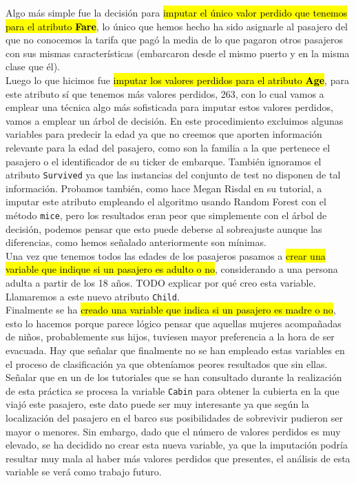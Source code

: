 \documentclass[10pt,a4paper]{article}
\newcommand{\emp}[1]{\sethlcolor{light-yellow}\hl{#1}} %
\newcommand{\code}[1]{\textcolor{rblue}{\texttt{#1}}} %
\begin{document}
Algo más simple fue la decisión para \emp{imputar el único valor perdido que tenemos para el atributo \textbf{Fare}}, lo único que hemos hecho ha sido asignarle al pasajero del que no conocemos la tarifa que pagó la media de lo que pagaron otros pasajeros con sus mismas características (embarcaron desde el mismo puerto y en la misma clase que él).\\

Luego lo que hicimos fue \emp{imputar los valores perdidos para el atributo \textbf{Age}}, para este atributo sí que tenemos más valores perdidos, 263, con lo cual vamos a emplear una técnica algo más sofisticada para imputar estos valores perdidos, vamos a emplear un árbol de decisión. En este procedimiento excluimos algunas variables para predecir la edad ya que no creemos que aporten información relevante para la edad del pasajero, como son la familia a la que pertenece el pasajero o el identificador de su ticker de embarque. También ignoramos el atributo \code{Survived} ya que las instancias del conjunto de test no disponen de tal información. Probamos también, como hace Megan Risdal en su tutorial, a imputar este atributo empleando el algoritmo usando Random Forest con el método \code{mice}, pero los resultados eran peor que simplemente con el árbol de decisión, podemos pensar que esto puede deberse al sobreajuste aunque las diferencias, como hemos señalado anteriormente son mínimas.\\

Una vez que tenemos todos las edades de los pasajeros pasamos a \emp{crear una variable que indique si un pasajero es adulto o no}, considerando a una persona adulta a partir de los 18 años. TODO explicar por qué creo esta variable. Llamaremos a este nuevo atributo \code{Child}.\\

Finalmente se ha \emp{creado una variable que indica si un pasajero es madre o no}, esto lo hacemos porque parece lógico pensar que aquellas mujeres acompañadas de niños, probablemente sus hijos, tuviesen mayor preferencia a la hora de ser evacuada. Hay que señalar que finalmente no se han empleado estas variables en el proceso de clasificación ya que obteníamos peores resultados que sin ellas.\\

Señalar que en un de los tutoriales que se han consultado durante la realización de esta práctica se procesa la variable \code{Cabin} para obtener la cubierta en la que viajó este pasajero, este dato puede ser muy interesante ya que según la localización del pasajero en el barco sus posibilidades de sobrevivir pudieron ser mayor o menores. Sin embargo, dado que el número de valores perdidos es muy elevado, se ha decidido no crear esta nueva variable, ya que la imputación podría resultar muy mala al haber más valores perdidos que presentes, el análisis de esta variable se verá como trabajo futuro.
\end{document}
